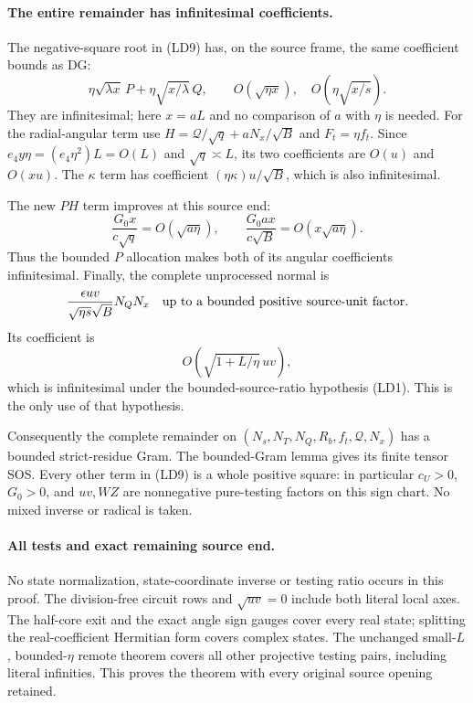 \paragraph{The entire remainder has infinitesimal coefficients.}
The negative-square root in (LD9) has, on the source frame,
the same coefficient bounds as DG:
\[
 \eta\sqrt{\lambda x}\,P+
           \eta\sqrt{x/\lambda}\,Q,
 \qquad O(\sqrt{\eta x}),\quad
           O(\eta\sqrt{x/s}).                       \tag{LD12}
\]
They are infinitesimal; here $x=aL$ and no comparison of $a$ with
$\eta$ is needed. For the radial-angular term use
$H=\mathcal Q/\sqrt q+aN_x/\sqrt B$ and $F_t=\eta f_t$.
Since $e_4y\eta=(e_4\eta^2)L=O(L)$ and $\sqrt q\asymp L$,
its two coefficients are $O(u)$ and $O(xu)$.
The $\kappa$ term has coefficient
$(\eta\kappa)u/\sqrt B$, which is also infinitesimal.

The new $PH$ term improves at this source end:
\[
 \frac{G_0x}{c\sqrt q}=O(\sqrt{a\eta}),\qquad
 \frac{G_0ax}{c\sqrt B}=O(x\sqrt{a\eta}).            \tag{LD13}
\]
Thus the bounded $P$ allocation makes both of its angular coefficients
infinitesimal. Finally, the complete unprocessed normal is
\[
 \frac{\epsilon uv}{\sqrt{\eta s}\sqrt B}N_QN_x
   \quad\hbox{up to a bounded positive source-unit factor}.
\]
Its coefficient is
\[
                  O\!\left(\sqrt{1+L/\eta}\,uv\right),          \tag{LD14}
\]
which is infinitesimal under the bounded-source-ratio
hypothesis (LD1). This is the only use of that hypothesis.

Consequently the complete remainder on
$(N_s,N_T,N_Q,R_b,f_t,\mathcal Q,N_x)$ has a bounded strict-residue
Gram. The bounded-Gram lemma gives its finite tensor SOS. Every other
term in (LD9) is a whole positive square: in particular $c_U>0$,
$G_0>0$, and $uv,WZ$ are nonnegative pure-testing factors on this
sign chart. No mixed inverse or radical is taken.

\paragraph{All tests and exact remaining source end.}
No state normalization, state-coordinate inverse or testing ratio
occurs in this proof. The division-free circuit rows and
$\sqrt{uv}=0$ include both literal local axes. The half-core exit
and the exact angle sign gauges cover every real state; splitting
the real-coefficient Hermitian form covers complex states. The
unchanged small-$L$, bounded-$\eta$ remote theorem covers all other
projective testing pairs, including literal infinities. This proves
the theorem with every original source opening retained.


